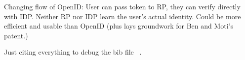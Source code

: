 \documentclass{llncs}
\begin{document}
Changing flow of OpenID: User can pass token to RP, they can verify
directly with IDP. Neither RP nor IDP learn the user's actual
identity. Could be more efficient and usable than OpenID (plus lays
groundwork for Ben and Moti's patent.)

Just citing everything to debug the bib file~
\cite{Cha82,Cha85,GMR89,Json,PyOpenId,ProviderApp,Jsbn,JaWa07,Adi07}.

\end{document}
